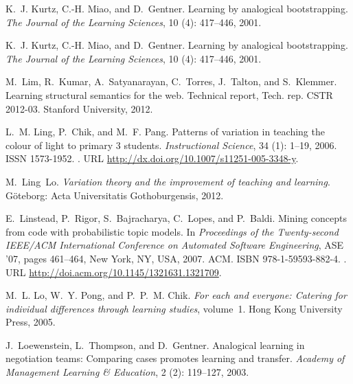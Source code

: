 \documentclass[12pt,twoside]{mitthesis}
\begin{document}
\begin{thebibliography}{135}
K.~J. Kurtz, C.-H. Miao, and D.~Gentner.
\newblock Learning by analogical bootstrapping.
\newblock \emph{The Journal of the Learning Sciences}, 10
  (4): 417--446, 2001{}.

K.~J. Kurtz, C.-H. Miao, and D.~Gentner.
\newblock Learning by analogical bootstrapping.
\newblock \emph{The Journal of the Learning Sciences}, 10
  (4): 417--446, 2001{}.

M.~Lim, R.~Kumar, A.~Satyanarayan, C.~Torres, J.~Talton, and S.~Klemmer.
\newblock Learning structural semantics for the web.
\newblock Technical report, Tech. rep. CSTR 2012-03. Stanford University, 2012.

L.~M. Ling, P.~Chik, and M.~F. Pang.
\newblock Patterns of variation in teaching the colour of light to primary 3
  students.
\newblock \emph{Instructional Science}, 34 (1): 1--19, 2006.
\newblock ISSN 1573-1952.
\newblock {}.
\newblock URL \url{http://dx.doi.org/10.1007/s11251-005-3348-y}.

M.~Ling~Lo.
\newblock \emph{Variation theory and the improvement of teaching and learning}.
\newblock G{\"o}teborg: Acta Universitatis Gothoburgensis, 2012.

E.~Linstead, P.~Rigor, S.~Bajracharya, C.~Lopes, and P.~Baldi.
\newblock Mining concepts from code with probabilistic topic models.
\newblock In \emph{Proceedings of the Twenty-second IEEE/ACM International
  Conference on Automated Software Engineering}, ASE '07, pages 461--464, New
  York, NY, USA, 2007. ACM.
\newblock ISBN 978-1-59593-882-4.
\newblock {}.
\newblock URL \url{http://doi.acm.org/10.1145/1321631.1321709}.

M.~L. Lo, W.~Y. Pong, and P.~P.~M. Chik.
\newblock \emph{For each and everyone: Catering for individual differences
  through learning studies}, volume~1.
\newblock Hong Kong University Press, 2005.

J.~Loewenstein, L.~Thompson, and D.~Gentner.
\newblock Analogical learning in negotiation teams: Comparing cases promotes
  learning and transfer.
\newblock \emph{Academy of Management Learning \& Education}, 2
  (2): 119--127, 2003{}.


\end{thebibliography}
\end{document}
